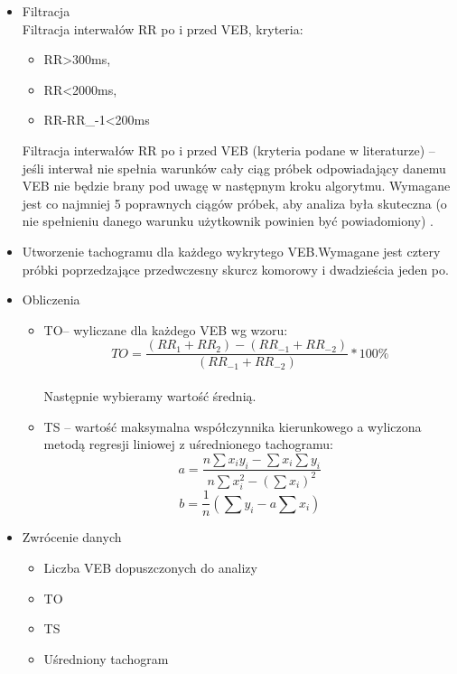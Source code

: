 \begin{itemize}
\item Filtracja\\
Filtracja interwałów RR po i przed VEB, kryteria:
\begin{itemize}
\item RR>300ms,
\item RR<2000ms,
\item RR-RR\_{-1}<200ms
\end{itemize}
Filtracja interwałów RR po i przed VEB (kryteria podane w literaturze) – jeśli interwał nie spełnia warunków cały ciąg próbek odpowiadający danemu VEB nie będzie brany pod uwagę w następnym kroku algorytmu.
Wymagane jest co najmniej 5 poprawnych ciągów próbek, aby analiza była skuteczna (o nie spełnieniu danego warunku użytkownik powinien być powiadomiony) .
\item Utworzenie tachogramu dla każdego wykrytego VEB.Wymagane jest cztery próbki poprzedzające przedwczesny skurcz komorowy i dwadzieścia jeden po.
\item Obliczenia\\
\begin{itemize}
\item TO– wyliczane dla każdego VEB wg wzoru: \begin{equation} TO=\frac{(RR_1+RR_2) - (RR_{-1} + RR_{-2})}{(RR_{-1} + RR_{-2})} * 100\% \end{equation} \\Następnie wybieramy wartość średnią.
\item TS – wartość maksymalna współczynnika kierunkowego a wyliczona metodą regresji liniowej z uśrednionego tachogramu:\\
\begin{equation} a=\frac{n\sum{x_iy_i}-\sum{x_i}\sum{y_i}}{n\sum{x_i^2}-(\sum{x_i})^2}\end{equation}
\begin{equation}b=\frac{1}{n}(\sum{y_i}-a\sum{x_i})\end{equation}
\end{itemize}
\item Zwrócenie danych
\begin{itemize}
\item Liczba VEB dopuszczonych do analizy
\item TO
\item TS
\item Uśredniony tachogram
\end{itemize}
\end{itemize}


